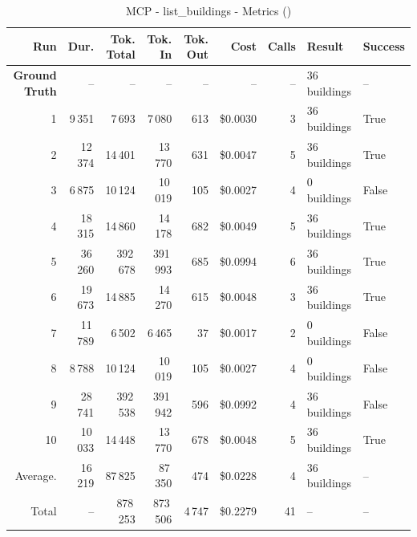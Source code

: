 \documentclass[a4paper,11pt]{article}
\begin{document}
\begin{table}[ht]
\centering
\scriptsize
\caption{MCP - list\_buildings - Metrics ()}
\label{tab:mcp\_list\_buildings\_metrics\_}
\begin{tabular}{r r r r r r r p{3cm} l}
\hline
Run & Dur. & Tok. Total & Tok. In & Tok. Out & Cost & Calls & Result & Success \\
\hline
\textbf{Ground Truth} & -- & -- & -- & -- & -- & -- & 36 buildings & -- \\
\hline
1 & 9\,351 & 7\,693 & 7\,080 & 613 & \$0.0030 & 3 & 36 buildings & True \\
2 & 12\,374 & 14\,401 & 13\,770 & 631 & \$0.0047 & 5 & 36 buildings & True \\
3 & 6\,875 & 10\,124 & 10\,019 & 105 & \$0.0027 & 4 & 0 buildings & False \\
4 & 18\,315 & 14\,860 & 14\,178 & 682 & \$0.0049 & 5 & 36 buildings & True \\
5 & 36\,260 & 392\,678 & 391\,993 & 685 & \$0.0994 & 6 & 36 buildings & True \\
6 & 19\,673 & 14\,885 & 14\,270 & 615 & \$0.0048 & 3 & 36 buildings & True \\
7 & 11\,789 & 6\,502 & 6\,465 & 37 & \$0.0017 & 2 & 0 buildings & False \\
8 & 8\,788 & 10\,124 & 10\,019 & 105 & \$0.0027 & 4 & 0 buildings & False \\
9 & 28\,741 & 392\,538 & 391\,942 & 596 & \$0.0992 & 4 & 36 buildings & False \\
10 & 10\,033 & 14\,448 & 13\,770 & 678 & \$0.0048 & 5 & 36 buildings & True \\
\hline
Average. & 16\,219 & 87\,825 & 87\,350 & 474 & \$0.0228 & 4 & 36 buildings & -- \\
Total & -- & 878\,253 & 873\,506 & 4\,747 & \$0.2279 & 41 & -- & -- \\
\hline
\end{tabular}
\end{table}

\clearpage
\end{document}
